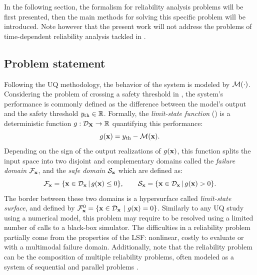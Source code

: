 In the following section, the formalism for reliability analysis problems will be first presented, 
then the main methods for solving this specific problem will be introduced. 
Note however that the present work will not address the problems of time-dependent reliability analysis tackled in \citet{rackwitz_2001,andrieu_2004_phi2,hawchar_2017}. 

\subsection{Problem statement}

Following the UQ methodology, the behavior of the system is modeled by $\mathcal{M}(\cdot)$. 
Considering the problem of crossing a safety threshold in , the system's performance is commonly defined as the difference between the model's output and the safety threshold $y_\mathrm{th}\in\mathbb{R}$. 
Formally, the \textit{limit-state function} () is a deterministic function $g:\mathcal{D}_{{\bf X}}\rightarrow\mathbb{R}$ quantifying this performance: 
\begin{equation}
    g({\bf x}) = y_\mathrm{th} - \mathcal{M}({\bf x}).
\end{equation}
Depending on the sign of the output realizations of $g({\bf x})$, this function splits the input space into two disjoint and complementary domains called  
the \textit{failure domain} $\mathcal{F}_{{\bf x}}$, and the \textit{safe domain} $\mathcal{S}_{\bf x}$ which are defined as:
\begin{equation}
    \mathcal{F}_{{\bf x}} = \{{\bf x} \in \mathcal{D}_{\bf x} \, | \,  g({\bf x}) \leq 0\}, \qquad 
    \mathcal{S}_{\bf x} = \{{\bf x} \in \mathcal{D}_{\bf x} \, | \, g({\bf x}) > 0\}. 
\end{equation}
The border between these two domains is a hypersurface called \textit{limit-state surface}, and defined by $\mathcal{F}_{{\bf x}}^0 = \{{\bf x} \in \mathcal{D}_{\bf x} ~|~ g({\bf x}) = 0\}$. 
Similarly to any UQ study using a numerical model, this problem may require to be resolved using a limited number of calls to a black-box simulator. 
The difficulties in a reliability problem partially come from the properties of the LSF: nonlinear, costly to evaluate or with a multimodal failure domain. 
Additionally, note that the reliability problem can be the composition of multiple reliability problems, often modeled as a system of sequential and parallel problems \citep{lemaire_2009,derkiureghian_2022_book}.

